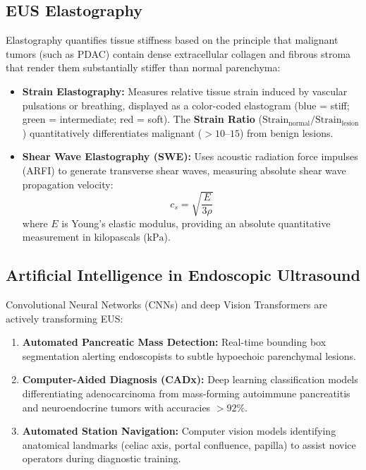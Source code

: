 \documentclass[11pt,a4paper]{article}
\begin{document}
\subsection{EUS Elastography}
Elastography quantifies tissue stiffness based on the principle that malignant tumors (such as PDAC) contain dense extracellular collagen and fibrous stroma that render them substantially stiffer than normal parenchyma:
\begin{itemize}[leftmargin=2em]
    \item \textbf{Strain Elastography:} Measures relative tissue strain induced by vascular pulsations or breathing, displayed as a color-coded elastogram (blue = stiff; green = intermediate; red = soft). The \textbf{Strain Ratio} ($\text{Strain}_{\text{normal}} / \text{Strain}_{\text{lesion}}$) quantitatively differentiates malignant ($> 10\text{--}15$) from benign lesions.
    \item \textbf{Shear Wave Elastography (SWE):} Uses acoustic radiation force impulses (ARFI) to generate transverse shear waves, measuring absolute shear wave propagation velocity:
    \begin{equation}
        c_s = \sqrt{\frac{E}{3\rho}}
    \end{equation}
    where $E$ is Young's elastic modulus, providing an absolute quantitative measurement in kilopascals ($\text{kPa}$).
\end{itemize}

\subsection{Artificial Intelligence in Endoscopic Ultrasound}
Convolutional Neural Networks (CNNs) and deep Vision Transformers are actively transforming EUS:
\begin{enumerate}
    \item \textbf{Automated Pancreatic Mass Detection:} Real-time bounding box segmentation alerting endoscopists to subtle hypoechoic parenchymal lesions.
    \item \textbf{Computer-Aided Diagnosis (CADx):} Deep learning classification models differentiating adenocarcinoma from mass-forming autoimmune pancreatitis and neuroendocrine tumors with accuracies $> 92\%$.
    \item \textbf{Automated Station Navigation:} Computer vision models identifying anatomical landmarks (celiac axis, portal confluence, papilla) to assist novice operators during diagnostic training.
\end{enumerate}
\end{document}
